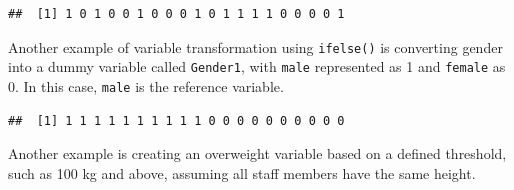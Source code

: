 \documentclass[
]{article}
\newenvironment{Shaded}{\begin{snugshade}}{\end{snugshade}}
\newcommand{\DecValTok}[1]{\textcolor[rgb]{0.00,0.00,0.81}{#1}}
\newcommand{\FunctionTok}[1]{\textcolor[rgb]{0.13,0.29,0.53}{\textbf{#1}}}
\newcommand{\NormalTok}[1]{#1}
\newcommand{\OtherTok}[1]{\textcolor[rgb]{0.56,0.35,0.01}{#1}}
\newcommand{\SpecialCharTok}[1]{\textcolor[rgb]{0.81,0.36,0.00}{\textbf{#1}}}
\newcommand{\StringTok}[1]{\textcolor[rgb]{0.31,0.60,0.02}{#1}}
\begin{document}
\begin{Shaded}
\end{Shaded}

\begin{verbatim}
##  [1] 1 0 1 0 0 1 0 0 0 1 0 1 1 1 1 0 0 0 0 1
\end{verbatim}

Another example of variable transformation using \texttt{ifelse()} is
converting gender into a dummy variable called \texttt{Gender1}, with
\texttt{male} represented as 1 and \texttt{female} as 0. In this case,
\texttt{male} is the reference variable.

\begin{Shaded}
\end{Shaded}

\begin{verbatim}
##  [1] 1 1 1 1 1 1 1 1 1 1 0 0 0 0 0 0 0 0 0 0
\end{verbatim}

Another example is creating an overweight variable based on a defined
threshold, such as 100 kg and above, assuming all staff members have the
same height.

\begin{Shaded}
\end{Shaded}
\end{document}

